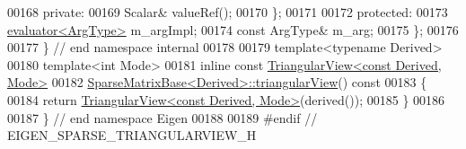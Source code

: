 \begin{DoxyCode}
00168     \textcolor{keyword}{private}:
00169       Scalar& valueRef();
00170   \};
00171   
00172 \textcolor{keyword}{protected}:
00173   \hyperlink{struct_eigen_1_1internal_1_1evaluator}{evaluator<ArgType>} m\_argImpl;
00174   \textcolor{keyword}{const} ArgType& m\_arg;
00175 \};
00176 
00177 \} \textcolor{comment}{// end namespace internal}
00178 
00179 \textcolor{keyword}{template}<\textcolor{keyword}{typename} Derived>
00180 \textcolor{keyword}{template}<\textcolor{keywordtype}{int} Mode>
00181 \textcolor{keyword}{inline} \textcolor{keyword}{const} \hyperlink{group___core___module_class_eigen_1_1_triangular_view}{TriangularView<const Derived, Mode>}
00182 \hyperlink{group___sparse_core___module_class_eigen_1_1_sparse_matrix_base}{SparseMatrixBase<Derived>::triangularView}()\textcolor{keyword}{ const}
00183 \textcolor{keyword}{}\{
00184   \textcolor{keywordflow}{return} \hyperlink{group___core___module_class_eigen_1_1_triangular_view}{TriangularView<const Derived, Mode>}(derived());
00185 \}
00186 
00187 \} \textcolor{comment}{// end namespace Eigen}
00188 
00189 \textcolor{preprocessor}{#endif // EIGEN\_SPARSE\_TRIANGULARVIEW\_H}
\end{DoxyCode}
